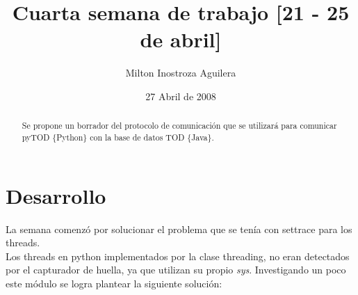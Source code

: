 \documentclass[10pt,a4paper]{article}
\begin{document}
\renewcommand{\contentsname}{Indice} 
\renewcommand\listfigurename{Lista de Figuras}
\renewcommand\listtablename{Lista de Tablas}
\newcommand\bibname{Bibliografía}
\renewcommand{\refname}{Bibliografía}
\renewcommand\indexname{Indice alfabético}
\renewcommand\figurename{Figura}
\renewcommand\tablename{Tabla}
\renewcommand\partname{Parte}
\newcommand\chaptername{Capítulo}
\renewcommand\appendixname{Apéndice}
\renewcommand\abstractname{Resumen}

\title{Cuarta semana de trabajo [21 - 25 de abril]}
\author{Milton Inostroza Aguilera}
\date{27 Abril de 2008}
\clearpage
\maketitle

\begin{abstract}
Se propone un borrador del protocolo de comunicación que se utilizará para comunicar pyTOD \{Python\} con la base de datos TOD \{Java\}.

\end{abstract}
\newpage
\tableofcontents
\newpage
\listoffigures
\newpage
\listoftables
\newpage
\section{Desarrollo}
La semana comenzó por solucionar el problema que se tenía con settrace para los threads.\\

Los threads en python implementados por la clase threading, no eran detectados por el capturador de huella, ya que utilizan su propio \textit{sys}.  Investigando un poco este módulo se logra plantear la siguiente solución:
\end{document}
